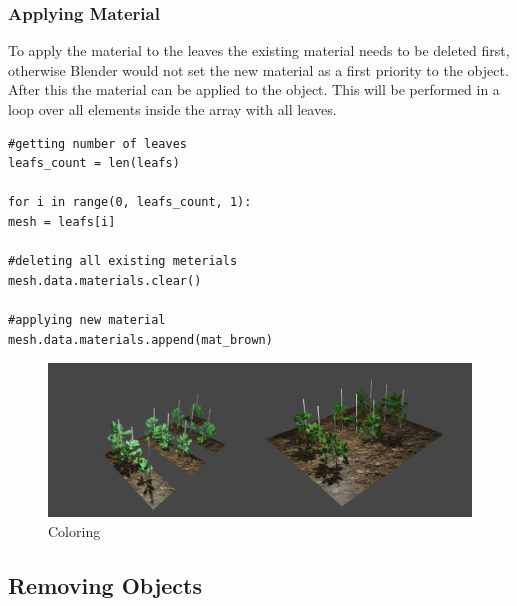 \subsubsection*{Applying Material}
To apply the material to the leaves the existing material needs to be deleted first, otherwise Blender would not set the new material as a first priority to the object. After this the material can be applied to the object. This will be performed in a loop over all elements inside the array with all leaves.

\lstset{language=Python, frame=single}
\begin{lstlisting}
#getting number of leaves
leafs_count = len(leafs)

for i in range(0, leafs_count, 1):
mesh = leafs[i]

#deleting all existing meterials
mesh.data.materials.clear()

#applying new material
mesh.data.materials.append(mat_brown)
\end{lstlisting}


\begin{figure}[h]
\centering
\includegraphics[width=1\textwidth]{coloring.png}
\caption{Coloring}
\label{coloring}
\end{figure}


\subsection{Removing Objects}


